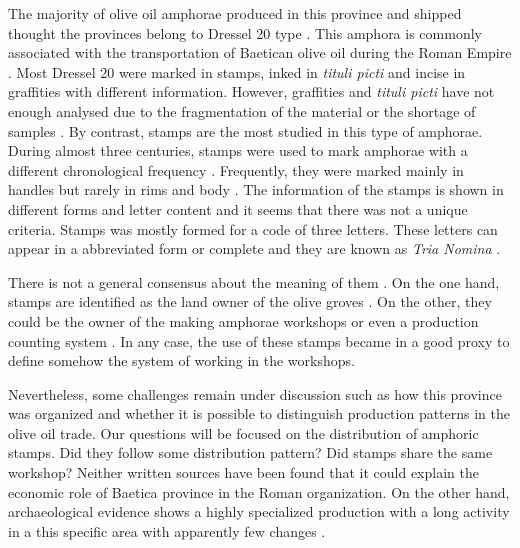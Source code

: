 \documentclass[review]{elsarticle}
\begin{document}
The majority of olive oil amphorae produced in this province and shipped thought the provinces belong to Dressel 20 type \citep{dressel,martin-kilcher_romischen_1994}. This amphora is commonly associated with the transportation of Baetican olive oil during the Roman Empire \citep{berni_millet_epigrafianforica_2008}. Most Dressel 20 were marked in stamps, inked in \textit{tituli picti} and incise in graffities with different information. However, graffities and \textit{tituli picti} have not enough analysed due to the fragmentation of the material or the shortage of samples \citep{aguilera_evolucion_2007,rovira_guardiola_grafitos_2007}. By contrast, stamps are the most studied in this type of amphorae. During almost three centuries, stamps were used to mark amphorae with a different chronological frequency \citep{remesal_sellar_2016}. Frequently, they were marked mainly in handles but rarely in rims and body \citep{millet_anforas_1998}. 
The information of the stamps is shown in different forms and letter content and it seems that there was not a unique criteria. Stamps was mostly formed for a code of three letters. These letters can appear in a abbreviated form or complete and they are known as \textit{Tria Nomina} \citep{berni_millet_amphora_1996}. 

 There is not a general consensus about the meaning of them \citep{rodriguez_baetican_1998}. On the one hand, stamps are identified as the land owner of the olive groves \citep{rodriguez_economioleicola_1977}. On the other, they could be the owner of the making amphorae workshops or even a production counting system  \citep{berni_millet_epigrafianforica_2008}. In any case, the use of these stamps became in a good proxy to define somehow the system of working in the workshops. 

Nevertheless, some challenges remain under discussion such as how this province was organized and whether it is possible to distinguish production patterns in the olive oil trade. Our questions will be focused on the distribution of amphoric stamps. Did they follow some distribution pattern? Did stamps share the same workshop? Neither written sources have been found that it could explain the economic role of Baetica province in the Roman organization. On the other hand, archaeological evidence shows a highly specialized production with a long activity in a this specific area with apparently few changes \citep{remesal_anforas_2004}. 

\end{document}
